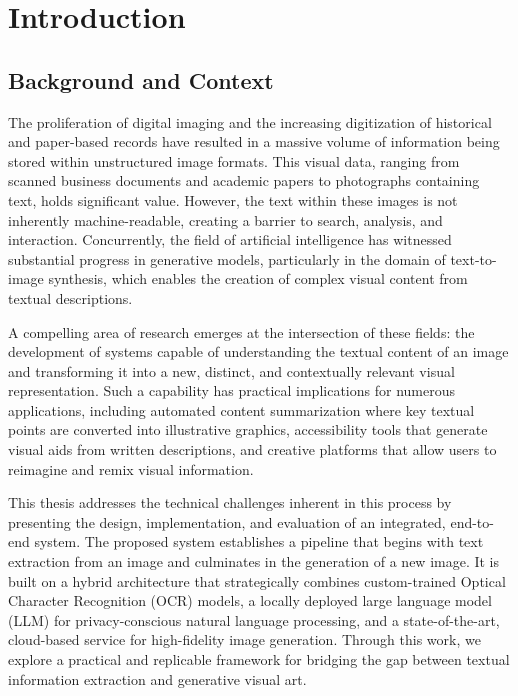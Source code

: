 \chapter{Introduction}

\section{Background and Context}
The proliferation of digital imaging and the increasing digitization of historical and paper-based records have resulted in a massive volume of information being stored within unstructured image formats. This visual data, ranging from scanned business documents and academic papers to photographs containing text, holds significant value. However, the text within these images is not inherently machine-readable, creating a barrier to search, analysis, and interaction. Concurrently, the field of artificial intelligence has witnessed substantial progress in generative models, particularly in the domain of text-to-image synthesis, which enables the creation of complex visual content from textual descriptions.

A compelling area of research emerges at the intersection of these fields: the development of systems capable of understanding the textual content of an image and transforming it into a new, distinct, and contextually relevant visual representation. Such a capability has practical implications for numerous applications, including automated content summarization where key textual points are converted into illustrative graphics, accessibility tools that generate visual aids from written descriptions, and creative platforms that allow users to reimagine and remix visual information.

This thesis addresses the technical challenges inherent in this process by presenting the design, implementation, and evaluation of an integrated, end-to-end system. The proposed system establishes a pipeline that begins with text extraction from an image and culminates in the generation of a new image. It is built on a hybrid architecture that strategically combines custom-trained Optical Character Recognition (OCR) models, a locally deployed large language model (LLM) for privacy-conscious natural language processing, and a state-of-the-art, cloud-based service for high-fidelity image generation. Through this work, we explore a practical and replicable framework for bridging the gap between textual information extraction and generative visual art.

